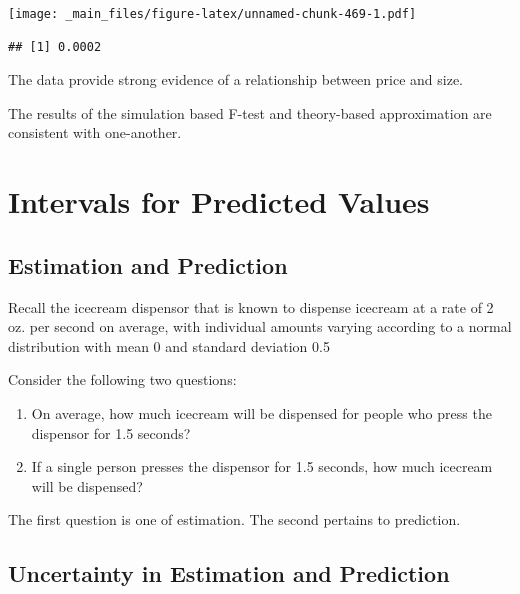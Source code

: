 \documentclass[]{book}
\newenvironment{Shaded}{\begin{snugshade}}{\end{snugshade}}
\newcommand{\KeywordTok}[1]{\textcolor[rgb]{0.13,0.29,0.53}{\textbf{#1}}}
\newcommand{\StringTok}[1]{\textcolor[rgb]{0.31,0.60,0.02}{#1}}
\newcommand{\OperatorTok}[1]{\textcolor[rgb]{0.81,0.36,0.00}{\textbf{#1}}}
\newcommand{\NormalTok}[1]{#1}
\begin{document}
\texttt{[image: \_main\_files/figure-latex/unnamed-chunk-469-1.pdf]}

\begin{Shaded}
\end{Shaded}

\begin{verbatim}
## [1] 0.0002
\end{verbatim}

The data provide strong evidence of a relationship between price and
size.

The results of the simulation based F-test and theory-based
approximation are consistent with one-another.

\section{Intervals for Predicted
Values}\label{intervals-for-predicted-values}

\subsection{Estimation and Prediction}\label{estimation-and-prediction}

Recall the icecream dispensor that is known to dispense icecream at a
rate of 2 oz. per second on average, with individual amounts varying
according to a normal distribution with mean 0 and standard deviation
0.5

Consider the following two questions:

\begin{enumerate}
\def\labelenumi{\arabic{enumi}.}
\item
  On average, how much icecream will be dispensed for people who press
  the dispensor for 1.5 seconds?
\item
  If a single person presses the dispensor for 1.5 seconds, how much
  icecream will be dispensed?
\end{enumerate}

The first question is one of estimation. The second pertains to
prediction.

\subsection{Uncertainty in Estimation and
Prediction}\label{uncertainty-in-estimation-and-prediction}
\end{document}
